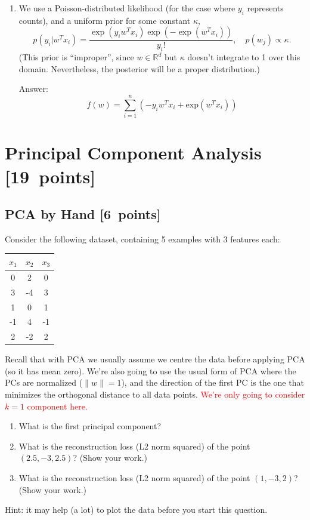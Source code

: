 \documentclass{article}
\newcommand{\blu}[1]{{\textcolor{blu}{#1}}}
\newcommand{\red}[1]{\textcolor{red}{#1}}
\newenvironment{answer}{\par\begingroup\color{gre}Answer: }{\endgroup}
\let\ask\blu
\let\update\red
\newcommand\pts[1]{\textcolor{pointscolour}{[#1~points]}}
\def\R{\mathbb{R}}
\newcommand{\norm}[1]{\lVert #1 \rVert}
\begin{document}
\begin{enumerate}
\item We use a Poisson-distributed likelihood (for the case where $y_i$ represents counts), and a uniform prior for some constant $\kappa$,
\[
p(y_i | w^Tx_i) = \frac{\exp(y_iw^Tx_i)\exp(-\exp(w^Tx_i))}{y_i!}, \quad p(w_j) \propto \kappa.
\]
(This prior is 	``improper'', since $w\in\R^d$ but $\kappa$ doesn't integrate to 1 over this domain. Nevertheless, the posterior will be a proper distribution.)
\begin{answer}
	\begin{equation*}
		f(w) = \sum_{i = 1}^n \left(-y_i w^T x_i + \text{exp}(w^T x_i)\right)
	\end{equation*}
\end{answer}

\end{enumerate}


\clearpage
\section{Principal Component Analysis \pts{19}}
\subsection{PCA by Hand \pts{6}}

Consider the following dataset, containing 5 examples with 3 features each:
\begin{center}
  \begin{tabular}{ccc}
    $x_1$ & $x_2$ & $x_3$ \\
    \hline
     0 &  2 &  0 \\
     3 & -4 &  3 \\
     1 &  0 &  1 \\
    -1 &  4 & -1 \\
     2 & -2 &  2 \\
  \end{tabular}
\end{center}
Recall that with PCA we usually assume we centre the data before applying PCA (so it has mean zero).
We're also going to use the usual form of PCA where the PCs are normalized ($\norm{w} = 1$),
and the direction of the first PC is the one that minimizes the orthogonal distance to all data points.
\update{We're only going to consider $k = 1$ component here.}
\begin{enumerate}
  \item \ask{What is the first principal component?}
  \item \ask{What is the reconstruction loss (L2 norm squared) of the point $(2.5, -3, 2.5)$? (Show your work.)}
  \item \ask{What is the reconstruction loss (L2 norm squared) of the point $(1, -3, 2)$? (Show your work.)}
\end{enumerate}
Hint: it may help (a lot) to plot the data before you start this question.
\end{document}
